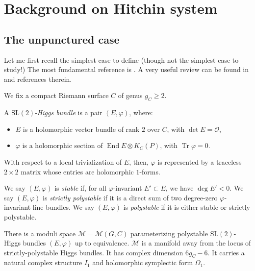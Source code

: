 \documentclass[12pt,letterpaper,reqno]{article}
\numberwithin{equation}{section}
\begin{document}
\section{Background on Hitchin system}

\subsection{The unpunctured case}

Let me first recall the simplest case to define (though not the simplest
case to study!) The most fundamental reference is \cite{MR89a:32021}.
A very useful review can be found in
\cite{Wentworth2014} and references therein.

We fix a compact Riemann surface $C$ of genus $g_C \ge 2$.

\begin{defn} \label{def:higgs}
A $\mathrm{SL}(2)$-\textit{Higgs bundle} is a pair $(E, \varphi)$, where:
\begin{itemize}
  \item $E$ is a holomorphic vector bundle of rank $2$ over $C$, with $\det E = \mathcal O$,
  \item $\varphi$ is a holomorphic section of $\operatorname{End} E \otimes K_C(P)$, with $\operatorname{Tr} \varphi = 0$.
\end{itemize}
\end{defn}
With respect to a local trivialization of $E$, then, $\varphi$ is represented
by a traceless $2 \times 2$ matrix whose entries are holomorphic $1$-forms.

\begin{defn}
We say $(E,\varphi)$ is \textit{stable} if, for all $\varphi$-invariant $E' \subset E$, we have $\deg E' < 0$.
We say $(E,\varphi)$ is \textit{strictly polystable} if it is a direct sum of two degree-zero $\varphi$-invariant line bundles.
We say $(E,\varphi)$ is \textit{polystable} if it is either stable or strictly polystable.
\end{defn}

\begin{prop}
There is a moduli space $\mathcal M = \mathcal M(G,C)$ parameterizing
polystable $\mathrm{SL}(2)$-Higgs bundles $(E,\varphi)$ 
up to equivalence. 
$\mathcal M$ is a manifold away
from the locus of strictly-polystable Higgs bundles.
It has complex dimension $6 g_C - 6$.
It carries a natural complex structure $I_1$ and holomorphic symplectic form $\Omega_1$.
\end{prop}
\end{document}
